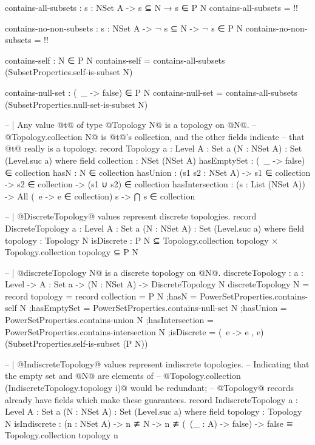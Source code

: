 \begin{code}
  contains-all-subsets : {s : NSet A} -> s ⊆ N → s ∈ P N
  contains-all-subsets = {!!}

  contains-no-non-subsets : {s : NSet A} -> ¬ s ⊆ N -> ¬ s ∈ P N
  contains-no-non-subsets = {!!}

  contains-self : N ∈ P N
  contains-self = contains-all-subsets (SubsetProperties.self-is-subset N)

  contains-null-set : (\ _ -> false) ∈ P N
  contains-null-set = contains-all-subsets (SubsetProperties.null-set-is-subset N)

-- | Any value @t@ of type @Topology N@ is a topology on @N@.
-- @Topology.collection N@ is @t@'s collection, and the other fields indicate
-- that @t@ really is a topology.
record Topology {a : Level}
                {A : Set a}
                (N : NSet A) : Set (Level.suc a) where
  field
    collection : NSet (NSet A)
    hasEmptySet : (\ _ -> false) ∈ collection
    hasN : N ∈ collection
    hasUnion : (s1 s2 : NSet A) ->
               s1 ∈ collection ->
               s2 ∈ collection ->
               (s1 ∪ s2) ∈ collection
    hasIntersection : (s : List (NSet A)) ->
                      All (\ e -> e ∈ collection) s ->
                      ⋂ s ∈ collection

-- | @DiscreteTopology@ values represent discrete topologies.
record DiscreteTopology {a : Level}
                        {A : Set a}
                        (N : NSet A) : Set (Level.suc a) where
  field
    topology : Topology N
    isDiscrete : P N ⊆ Topology.collection topology ×
                 Topology.collection topology ⊆ P N

-- | @discreteTopology N@ is a discrete topology on @N@.
discreteTopology : {a : Level} -> {A : Set a} -> (N : NSet A) -> DiscreteTopology N
discreteTopology N = record
  {topology = record
     {collection = P N
     ;hasN = PowerSetProperties.contains-self N
     ;hasEmptySet = PowerSetProperties.contains-null-set N
     ;hasUnion = PowerSetProperties.contains-union N
     ;hasIntersection = PowerSetProperties.contains-intersection N
     }
  ;isDiscrete = (\ e -> e , e) (SubsetProperties.self-is-subset (P N))}

-- | @IndiscreteTopology@ values represent indiscrete topologies.
-- Indicating that the empty set and @N@ are elements of
-- @Topology.collection (IndiscreteTopology.topology i)@ would be redundant;
-- @Topology@ records already have fields which make these guarantees.
record IndiscreteTopology {a : Level}
                          {A : Set a}
                          (N : NSet A) : Set (Level.suc a) where
  field
    topology : Topology N
    isIndiscrete : (n : NSet A) ->
                   n ≇ N ->
                   n ≇ (\ (_ : A) -> false)
                   -> false ≅ Topology.collection topology n


\end{code}
